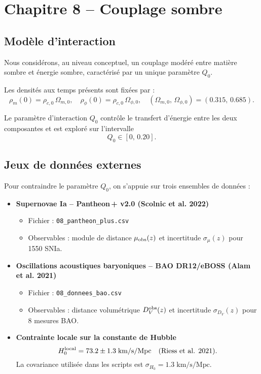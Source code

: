 \section{Chapitre 8 – Couplage sombre}

\subsection{Modèle d’interaction}

Nous considérons, au niveau conceptuel, un couplage modéré entre matière sombre et énergie sombre, caractérisé par un unique paramètre \(Q_{0}\).

Les densités aux temps présents sont fixées par :
\[
  \rho_{m}(0) = \rho_{c,0}\,\Omega_{m,0},
  \quad
  \rho_{\phi}(0) = \rho_{c,0}\,\Omega_{\phi,0},
  \quad
  (\Omega_{m,0},\,\Omega_{\phi,0}) = (0.315,\,0.685).
\]

Le paramètre d’interaction \(Q_{0}\) contrôle le transfert d’énergie entre les deux composantes et est exploré sur l’intervalle
\[
  Q_{0} \in [0,\,0.20].
\]

\subsection{Jeux de données externes}

Pour contraindre le paramètre \(Q_{0}\), on s’appuie sur trois ensembles de données :

\begin{itemize}
  \item \textbf{Supernovae Ia – Pantheon\,+ v2.0 (Scolnic et al. 2022)}
    \begin{itemize}
      \item Fichier : \texttt{08\_pantheon\_plus.csv}
      \item Observables : module de distance \(\mu_{\rm obs}(z)\) et incertitude \(\sigma_{\mu}(z)\) pour 1550 SNIa.
    \end{itemize}

  \item \textbf{Oscillations acoustiques baryoniques – BAO DR12/eBOSS (Alam et al. 2021)}
    \begin{itemize}
      \item Fichier : \texttt{08\_donnees\_bao.csv}
      \item Observables : distance volumétrique \(D_{V}^{\rm obs}(z)\) et incertitude \(\sigma_{D_{V}}(z)\) pour 8 mesures BAO.
    \end{itemize}

  \item \textbf{Contrainte locale sur la constante de Hubble}
    \[
      H_{0}^{\rm local} = 73.2 \pm 1.3 \;\mathrm{km/s/Mpc}
      \quad(\text{Riess et al. 2021}).
    \]
    La covariance utilisée dans les scripts est \(\sigma_{H_0}=1.3\;\mathrm{km/s/Mpc}\).
\end{itemize}

